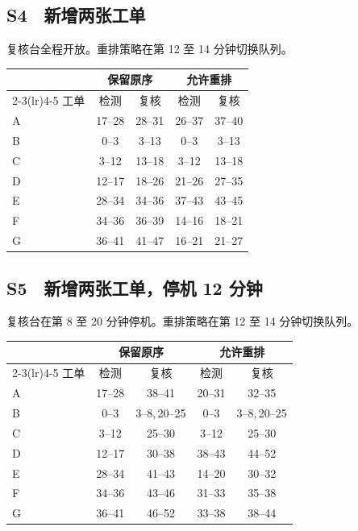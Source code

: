 {\subsection*{S4　新增两张工单}
复核台全程开放。重排策略在第 12 至 14 分钟切换队列。\par
\begin{center}\small
\begingroup\setlength{\tabcolsep}{5pt}
\begin{tabular}{@{}lcccc@{}}
\toprule
 & \multicolumn{2}{c}{保留原序} & \multicolumn{2}{c}{允许重排} \\
\cmidrule(lr){2-3}\cmidrule(lr){4-5}
工单 & 检测 & 复核 & 检测 & 复核 \\
\midrule
A & 17--28 & 28--31 & 26--37 & 37--40 \\
B & 0--3 & 3--13 & 0--3 & 3--13 \\
C & 3--12 & 13--18 & 3--12 & 13--18 \\
D & 12--17 & 18--26 & 21--26 & 27--35 \\
E & 28--34 & 34--36 & 37--43 & 43--45 \\
F & 34--36 & 36--39 & 14--16 & 18--21 \\
G & 36--41 & 41--47 & 16--21 & 21--27 \\
\bottomrule
\end{tabular}\endgroup
\end{center}
\subsection*{S5　新增两张工单，停机 12 分钟}
复核台在第 8 至 20 分钟停机。重排策略在第 12 至 14 分钟切换队列。\par
\begin{center}\small
\begingroup\setlength{\tabcolsep}{5pt}
\begin{tabular}{@{}lcccc@{}}
\toprule
 & \multicolumn{2}{c}{保留原序} & \multicolumn{2}{c}{允许重排} \\
\cmidrule(lr){2-3}\cmidrule(lr){4-5}
工单 & 检测 & 复核 & 检测 & 复核 \\
\midrule
A & 17--28 & 38--41 & 20--31 & 32--35 \\
B & 0--3 & 3--8,\,20--25 & 0--3 & 3--8,\,20--25 \\
C & 3--12 & 25--30 & 3--12 & 25--30 \\
D & 12--17 & 30--38 & 38--43 & 44--52 \\
E & 28--34 & 41--43 & 14--20 & 30--32 \\
F & 34--36 & 43--46 & 31--33 & 35--38 \\
G & 36--41 & 46--52 & 33--38 & 38--44 \\
\bottomrule
\end{tabular}\endgroup
\end{center}%
}

